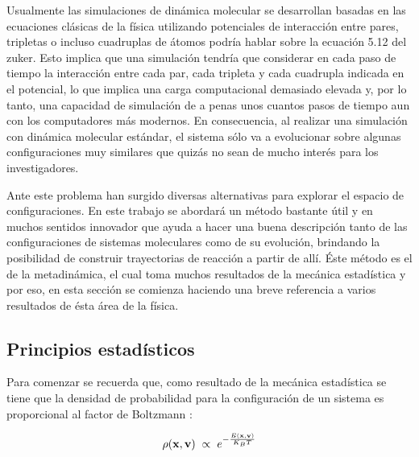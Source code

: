 \documentclass [11pt]{article}
\begin{document}
Usualmente las simulaciones de dinámica molecular se desarrollan basadas en las ecuaciones clásicas de la física utilizando potenciales de interacción entre pares, tripletas o incluso cuadruplas de átomos \cite{zukerman} {\color{magenta} podría hablar sobre la ecuación 5.12 del zuker}. Esto implica que una simulación tendría que considerar en cada paso de tiempo la interacción entre cada par, cada tripleta y cada cuadrupla indicada en el potencial, lo que implica una carga computacional demasiado elevada y, por lo tanto, una capacidad de simulación de a penas unos cuantos pasos de tiempo aun con los computadores más modernos. En consecuencia, al realizar una simulación con dinámica molecular estándar, el sistema sólo va a evolucionar sobre algunas configuraciones muy similares que quizás no sean de mucho interés para los investigadores. 

Ante este problema han surgido diversas alternativas para explorar el espacio de configuraciones. En este trabajo se abordará un método bastante útil y en muchos sentidos innovador que ayuda a hacer una buena descripción tanto de las configuraciones de sistemas moleculares como de su evolución, brindando la posibilidad de construir trayectorias de reacción a partir de allí. Éste método es el de la metadinámica, el cual toma muchos resultados de la mecánica estadística y por eso, en esta sección se comienza haciendo una breve referencia a varios resultados de ésta área de la física.

\subsection{Principios estadísticos}

Para comenzar se recuerda que, como resultado de la mecánica estadística se tiene que la densidad de probabilidad  para la configuración de un sistema es proporcional al factor de Boltzmann \cite{rief}:

\begin{equation}
    \rho ({\bf x},{\bf v}){\hspace{0.2cm}} {\displaystyle \propto} {\hspace{0.2 cm}}e^{-\frac{E({\bf x},{\bf v})}{K_BT}}
\end{equation}
\end{document}
